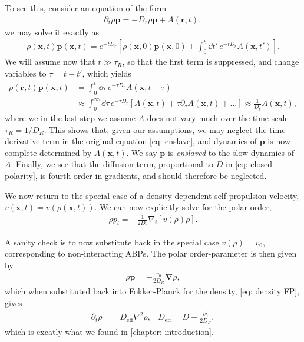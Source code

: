 To see this, consider an equation of the form
%
\begin{align} \label{eq: enslave}
    \partial_t \rho \bm p = - D_r \rho \bm p + A(\bm r, t),
\end{align}
%
we may solve it exactly as
%
\begin{align}
    \rho(\bm x, t) \bm p(\bm x,t)
    = e^{- t D_r} \left[ \rho(\bm x, 0) \bm p(\bm x,0) + \int_0^t \dd t' \, e^{- t D_r} A(\bm x,t') \right].
\end{align}
%
We will assume now that $t\gg \tau_R$, so that the first term is suppressed, and change variables to $\tau = t - t'$, which yields
%
\begin{align}
    \rho(\bm r, t) \bm p(\bm x, t)
    & = \int_0^t \dd \tau \, e^{- \tau  D_r} A(\bm x,t - \tau)\\
    & \approx
    \int_0^\infty \dd \tau \, e^{- \tau  D_r} [A(\bm x,t ) + \tau \partial_\tau A(\bm x, t) + ...]
    \approx \frac{1}{D_r} A(\bm x, t),
\end{align}
%
where we in the last step we assume $A$ does not vary much over the time-scale $\tau_R = 1 / D_R$.
This shows that, given our assumptions, we may neglect the time-derivative term in the original equation \autoref{eq: enslave}, and dynamics of $\bm p$ is now complete determined by $A(\bm x, t)$.
We say $\bm p$ is \emph{enslaved} to the slow dynamics of $A$.
Finally, we see that the diffusion term, proportional to $D$ in \autoref{eq: closed polarity}, is fourth order in gradients, and should therefore be neglected.

We now return to the special case of a density-dependent self-propulsion velocity, $v(\bm x, t) = v(\rho(\bm x, t))$.
We can now explicitly solve for the polar order,
%
\begin{align}
    \rho p_i = 
    - \frac{1}{2 D_r} \nabla_i  [v(\rho) \rho].
\end{align}
%

A sanity check is to now substitute back in the special case $v(\rho) = v_0$, corresponding to non-interacting ABPs.
The polar order-parameter is then given by
%
\begin{align}
    \rho \bm p = - \frac{v_0}{2 D_R} \bm \nabla \rho,
\end{align}
%
which when substituted back into Fokker-Planck for the density, \autoref{eq: density FP}, gives
%
\begin{align}
    \partial_t \rho &= D_{\mathrm{eff}} \nabla^2 \rho, &
    D_{\mathrm{eff}} = D + \frac{v_0^2}{2 D_R},
\end{align}
%
which is excatly what we found in \autoref{chapter: introduction}.

